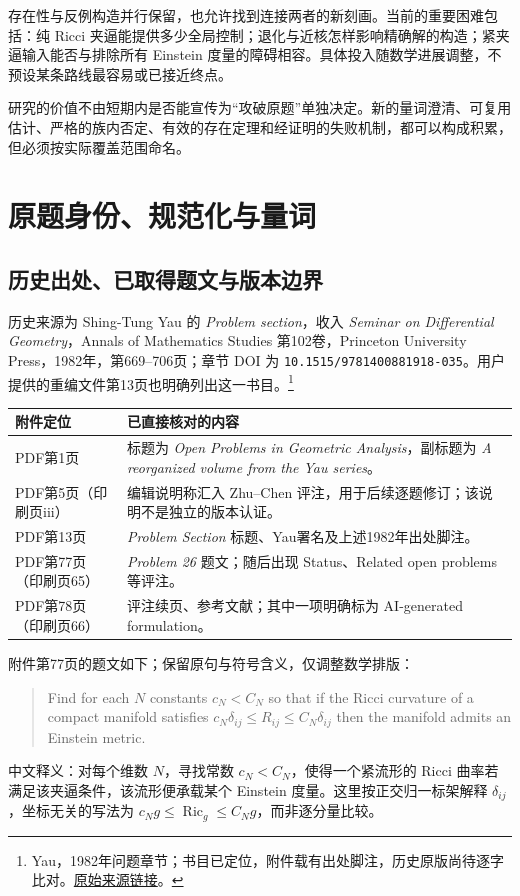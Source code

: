 \documentclass[11pt,a4paper]{article}
\theoremstyle{definition}
\newcommand{\Ric}{\operatorname{Ric}}
\newcommand{\src}[3]{\footnote{\raggedright #1，#2。\href{#3}{原始来源链接}。}}
\begin{document}
存在性与反例构造并行保留，也允许找到连接两者的新刻画。当前的重要困难包括：纯 Ricci 夹逼能提供多少全局控制；退化与近核怎样影响精确解的构造；紧夹逼输入能否与排除所有 Einstein 度量的障碍相容。具体投入随数学进展调整，不预设某条路线最容易或已接近终点。

研究的价值不由短期内是否能宣传为“攻破原题”单独决定。新的量词澄清、可复用估计、严格的族内否定、有效的存在定理和经证明的失败机制，都可以构成积累，但必须按实际覆盖范围命名。

\section{原题身份、规范化与量词}\label{sec:definition}

\subsection{历史出处、已取得题文与版本边界}

历史来源为 Shing-Tung Yau 的 \emph{Problem section}，收入 \emph{Seminar on Differential Geometry}，Annals of Mathematics Studies 第102卷，Princeton University Press，1982年，第669--706页；章节 DOI 为 \texttt{10.1515/9781400881918-035}。用户提供的重编文件第13页也明确列出这一书目。\src{Yau}{1982年问题章节；书目已定位，附件载有出处脚注，历史原版尚待逐字比对}{https://doi.org/10.1515/9781400881918-035}

\begin{longtable}{P{0.24\textwidth}P{0.69\textwidth}}
\toprule
附件定位 & 已直接核对的内容\\\midrule
PDF第1页 & 标题为 \emph{Open Problems in Geometric Analysis}，副标题为 \emph{A reorganized volume from the Yau series}。\\
PDF第5页（印刷页iii） & 编辑说明称汇入 Zhu--Chen 评注，用于后续逐题修订；该说明不是独立的版本认证。\\
PDF第13页 & \emph{Problem Section} 标题、Yau署名及上述1982年出处脚注。\\
PDF第77页（印刷页65） & \emph{Problem 26} 题文；随后出现 Status、Related open problems 等评注。\\
PDF第78页（印刷页66） & 评注续页、参考文献；其中一项明确标为 AI-generated formulation。\\\bottomrule
\end{longtable}

附件第77页的题文如下；保留原句与符号含义，仅调整数学排版：
\begin{quote}
Find for each $N$ constants $c_N<C_N$ so that if the Ricci curvature of a compact manifold satisfies $c_N\delta_{ij}\le R_{ij}\le C_N\delta_{ij}$ then the manifold admits an Einstein metric.
\end{quote}
中文释义：对每个维数 $N$，寻找常数 $c_N<C_N$，使得一个紧流形的 Ricci 曲率若满足该夹逼条件，该流形便承载某个 Einstein 度量。这里按正交归一标架解释 $\delta_{ij}$，坐标无关的写法为 $c_Ng\le\Ric_g\le C_Ng$，而非逐分量比较。
\end{document}
